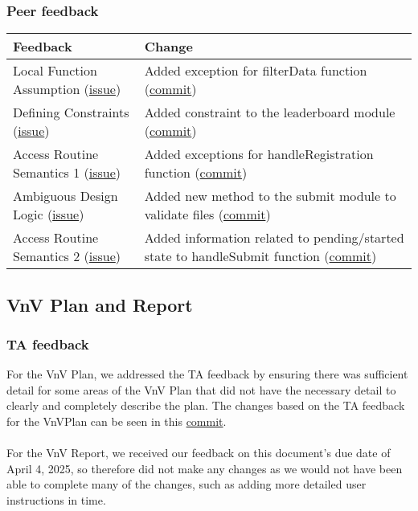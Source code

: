 \documentclass{article}
\begin{document}
\subsubsection{Peer feedback}
\begin{tabularx}{\textwidth}{X|X}
    \toprule
    \textbf{Feedback} & \textbf{Change}\\
    \midrule
    Local Function Assumption
    (\href{https://github.com/AidanMariglia/SOCAlgoTestPlatform/issues/95}{issue}) & 
    Added exception for filterData function (\href{https://github.com/AidanMariglia/SOCAlgoTestPlatform/commit/2877284dc71614806dbc69f6d295ecb31135e08d}{commit}) \\
    \midrule
    Defining Constraints
    (\href{https://github.com/AidanMariglia/SOCAlgoTestPlatform/issues/94}{issue}) & Added constraint to the leaderboard module (\href{https://github.com/AidanMariglia/SOCAlgoTestPlatform/pull/173/commits/16c6cb7f991c98e8ebbc915e939e17b30310b1ac}{commit}) \\
    \midrule
    Access Routine Semantics 1 (\href{https://github.com/AidanMariglia/SOCAlgoTestPlatform/issues/91}{issue}) & Added exceptions for handleRegistration function (\href{https://github.com/AidanMariglia/SOCAlgoTestPlatform/commit/9292fefebe491efc49891ff8ae6bb6ead1d43ca8}{commit}) \\
    \midrule
    Ambiguous Design Logic (\href{https://github.com/AidanMariglia/SOCAlgoTestPlatform/issues/92}{issue}) & Added new method to the submit module to validate files (\href{https://github.com/AidanMariglia/SOCAlgoTestPlatform/pull/173/commits/16c6cb7f991c98e8ebbc915e939e17b30310b1ac}{commit}) \\
    \midrule
    Access Routine Semantics 2 (\href{https://github.com/AidanMariglia/SOCAlgoTestPlatform/issues/93}{issue}) & 
    Added information related to pending/started state to handleSubmit function (\href{https://github.com/AidanMariglia/SOCAlgoTestPlatform/commit/c76be99d5e116b6f8c7547b98dd025331c373dd2}{commit}) \\
    \bottomrule
\end{tabularx}

\subsection{VnV Plan and Report}

\subsubsection{TA feedback}
For the VnV Plan, we addressed the TA feedback by ensuring there was sufficient detail for some areas of the VnV Plan that did not have the necessary detail to clearly and completely describe the plan. The changes based on the TA feedback for the VnVPlan can be seen in this \href{https://github.com/AidanMariglia/SOCAlgoTestPlatform/commit/4dd8cc2f49cf7ef66d83593cbfce6ae3db403463}{commit}.\\ \\
For the VnV Report, we received our feedback on this document's due date of April 4, 2025, so therefore did not make any changes as we would not have been able to complete many of the changes, such as adding more detailed user instructions in time. 
\end{document}
